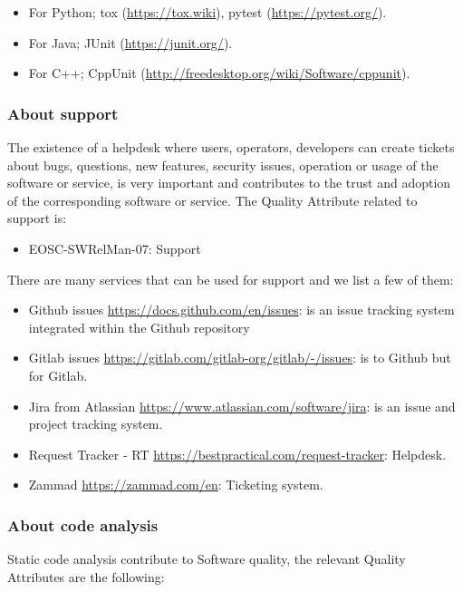 \begin{itemize}
\item For Python; tox (\url{https://tox.wiki}), pytest (\url{https://pytest.org/}).
\item For Java; JUnit (\url{https://junit.org/}).
\item For C++; CppUnit (\url{http://freedesktop.org/wiki/Software/cppunit}).
\end{itemize}

\subsubsection{About support}

The existence of a helpdesk where users, operators, developers can create tickets about bugs, questions, new features, security issues, operation or usage of the software or service, is very important and contributes to the trust and adoption of the corresponding software or service. The Quality Attribute related to support is:

\begin{itemize}
  \item EOSC-SWRelMan-07: Support
\end{itemize}

There are many services that can be used for support and we list a few of them:

\begin{itemize}
  \item Github issues \url{https://docs.github.com/en/issues}: is an issue tracking system integrated within the Github repository
  \item Gitlab issues \url{https://gitlab.com/gitlab-org/gitlab/-/issues}: is to Github but for Gitlab.
  \item Jira from Atlassian \url{https://www.atlassian.com/software/jira}: is an issue and project tracking system.
  \item Request Tracker - RT \url{https://bestpractical.com/request-tracker}: Helpdesk.
  \item Zammad \url{https://zammad.com/en}: Ticketing system.
\end{itemize}

\subsubsection{About code analysis}

Static code analysis contribute to Software quality, the relevant Quality Attributes are the following:

